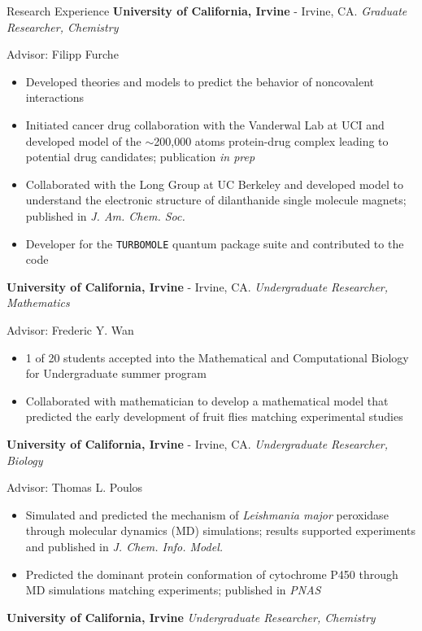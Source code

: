 \begin{rubric}{Research Experience}
  \textbf{University of California, Irvine} - Irvine, CA.
  \textit{Graduate Researcher, Chemistry}
  
  Advisor: Filipp Furche
  \vspace{-0.5em}
  \begin{itemize}
    \itemsep-0.5em
  \item Developed theories and models to predict the behavior of noncovalent interactions
  \item Initiated cancer drug collaboration with the Vanderwal Lab at UCI and developed model of
    the $\sim$200,000 atoms protein-drug complex leading to potential drug candidates; publication
    \textit{in prep}
  \item Collaborated with the Long Group at UC Berkeley and developed model to understand the electronic
    structure of dilanthanide single molecule magnets; published in \textit{J. Am. Chem. Soc.}
  \item Developer for the \texttt{TURBOMOLE} quantum package suite and contributed to the code
  \end{itemize}
  \textbf{University of California, Irvine} - Irvine, CA.
  \textit{Undergraduate Researcher, Mathematics}

  Advisor: Frederic Y. Wan
  \vspace{-0.5em}
  \begin{itemize}
  \itemsep-0.5em
  \item 1 of 20 students accepted into the Mathematical and Computational Biology for Undergraduate
    summer program
  \item Collaborated with mathematician to develop a mathematical model that predicted the early
    development of fruit flies matching experimental studies
  \end{itemize}
  \textbf{University of California, Irvine} - Irvine, CA.
  \textit{Undergraduate Researcher, Biology}

  Advisor: Thomas L. Poulos
  \vspace{-0.5em}
  \begin{itemize}
  \itemsep-0.5em
  \item Simulated and predicted the mechanism of \textit{Leishmania major} peroxidase through
    molecular dynamics (MD) simulations; results supported experiments and published in
    \textit{J. Chem. Info. Model.}
  \item Predicted the dominant protein conformation of cytochrome P450 through
    MD simulations matching experiments; published in \textit{PNAS}
  \end{itemize}
  \textbf{University of California, Irvine}
  \textit{Undergraduate Researcher, Chemistry}


\end{rubric}
